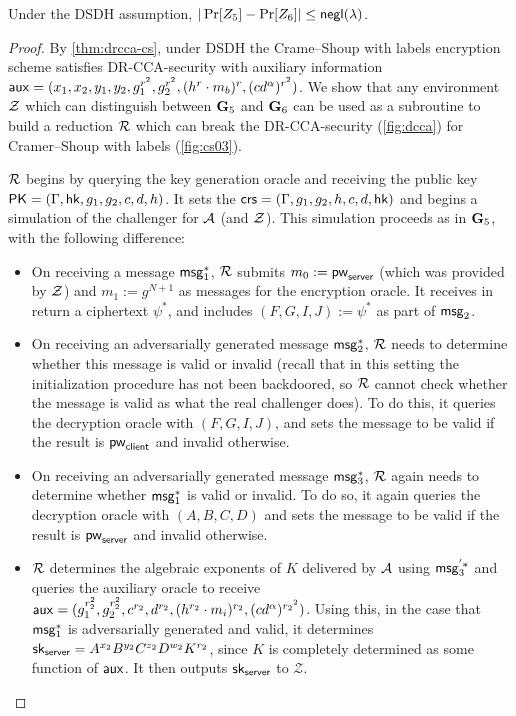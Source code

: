 \begin{lemma}
	Under the DSDH assumption, $|\Pr[Z_5]-\Pr[Z_6]|\leq\mathsf{negl}(\lambda)$.
\end{lemma}
\begin{proof}
	By \cref{thm:drcca-cs}, under DSDH the Crame--Shoup with labels encryption scheme satisfies DR-CCA-security with auxiliary information $\mathsf{aux} = (x_1,x_2,y_1,y_2,g_1^{r^2},g_2^{r^2},(h^r\cdot m_b)^{r},(cd^{\alpha})^{r^2})$. We show that any environment $\mathcal{Z}$ which can distinguish between $\mathbf{G}_5$ and $\mathbf{G}_6$ can be used as a subroutine to build a reduction $\mathcal{R}$ which can break the DR-CCA-security (\cref{fig:dcca}) for Cramer--Shoup with labels (\cref{fig:cs03}). 
	
	$\mathcal{R}$ begins by querying the key generation oracle and receiving the public key $\mathsf{PK} = (\Gamma,\mathsf{hk},g_1,g_2,c,d,h)$. It sets the $\mathsf{crs} = (\Gamma,g_1,g_2,h,c,d,\mathsf{hk})$ and begins a simulation of the challenger for $\mathcal{A}$ (and $\mathcal{Z}$). This simulation proceeds as in $\mathbf{G}_5$, with the following difference:
	
	\begin{itemize}
		\item On receiving a message $\mathsf{msg}_{1}^{*}$, $\mathcal{R}$ submits $m_0:=\mathsf{pw}_{\mathsf{server}}$ (which was provided by $\mathcal{Z}$) and $m_1:=g^{N+1}$ as messages for the encryption oracle. It receives in return a ciphertext $\psi^{*}$, and includes $(F,G,I,J):=\psi^{*}$ as part of $\mathsf{msg}_{2}$.
		\item On receiving an adversarially generated message $\mathsf{msg}_{2}^{*}$, $\mathcal{R}$ needs to determine whether this message is valid or invalid (recall that in this setting the initialization procedure has not been backdoored, so $\mathcal{R}$ cannot check whether the message is valid as what the real challenger does). To do this, it queries the decryption oracle with $(F,G,I,J)$, and sets the message to be valid if the result is $\mathsf{pw}_{\mathsf{client}}$ and invalid otherwise. 
		\item On receiving an adversarially generated message $\mathsf{msg}_{3}^{*}$, $\mathcal{R}$ again needs to determine whether $\mathsf{msg}_{1}^{*}$ is valid or invalid. To do so, it again queries the decryption oracle with $(A,B,C,D)$ and sets the message to be valid if the result is $\mathsf{pw}_{\mathsf{server}}$ and invalid otherwise.
		\item $\mathcal{R}$ determines the algebraic exponents of $K$ delivered by $\mathcal{A}$ using $\mathsf{msg}_{3}^{'*}$ and queries the auxiliary oracle to receive $\mathsf{aux} = (g_1^{r_2^2}, g_2^{r_2^2}, c^{r_2}, d^{r_2},(h^{r_2}\cdot m_i)^{r_2},(cd^{\alpha})^{{r_2}^2})$. Using this, in the case that $\mathsf{msg}_{1}^{*}$ is adversarially generated and valid, it determines $\mathsf{sk}_{\mathsf{server}} = A^{x_2}B^{y_2}C^{z_2}D^{w_2}K^{r_2}$, since $K$ is completely determined as some function of $\mathsf{aux}$. It then outputs $\mathsf{sk}_{\mathsf{server}}$ to $\mathcal{Z}$. 
	\end{itemize}


\end{proof}

